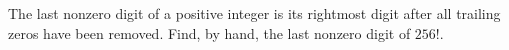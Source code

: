 The last nonzero digit of a positive integer is its rightmost digit after all trailing zeros have been removed. Find, by hand, the last nonzero digit of $256!$.
